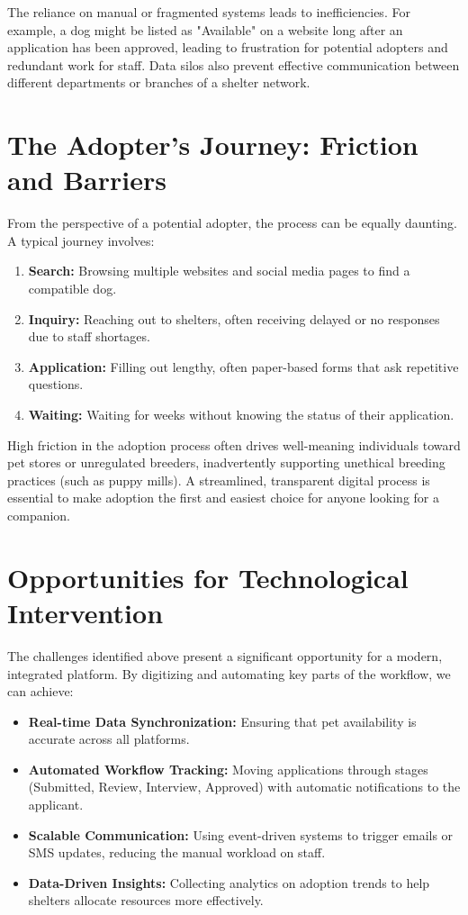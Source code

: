The reliance on manual or fragmented systems leads to inefficiencies. For example, a dog might be listed as "Available" on a website long after an application has been approved, leading to frustration for potential adopters and redundant work for staff. Data silos also prevent effective communication between different departments or branches of a shelter network.

\section{The Adopter's Journey: Friction and Barriers}

From the perspective of a potential adopter, the process can be equally daunting. A typical journey involves:
\begin{enumerate}
    \item \textbf{Search:} Browsing multiple websites and social media pages to find a compatible dog.
    \item \textbf{Inquiry:} Reaching out to shelters, often receiving delayed or no responses due to staff shortages.
    \item \textbf{Application:} Filling out lengthy, often paper-based forms that ask repetitive questions.
    \item \textbf{Waiting:} Waiting for weeks without knowing the status of their application.
\end{enumerate}

High friction in the adoption process often drives well-meaning individuals toward pet stores or unregulated breeders, inadvertently supporting unethical breeding practices (such as puppy mills). A streamlined, transparent digital process is essential to make adoption the first and easiest choice for anyone looking for a companion.

\section{Opportunities for Technological Intervention}

The challenges identified above present a significant opportunity for a modern, integrated platform. By digitizing and automating key parts of the workflow, we can achieve:
\begin{itemize}
    \item \textbf{Real-time Data Synchronization:} Ensuring that pet availability is accurate across all platforms.
    \item \textbf{Automated Workflow Tracking:} Moving applications through stages (Submitted, Review, Interview, Approved) with automatic notifications to the applicant.
    \item \textbf{Scalable Communication:} Using event-driven systems to trigger emails or SMS updates, reducing the manual workload on staff.
    \item \textbf{Data-Driven Insights:} Collecting analytics on adoption trends to help shelters allocate resources more effectively.
\end{itemize}

